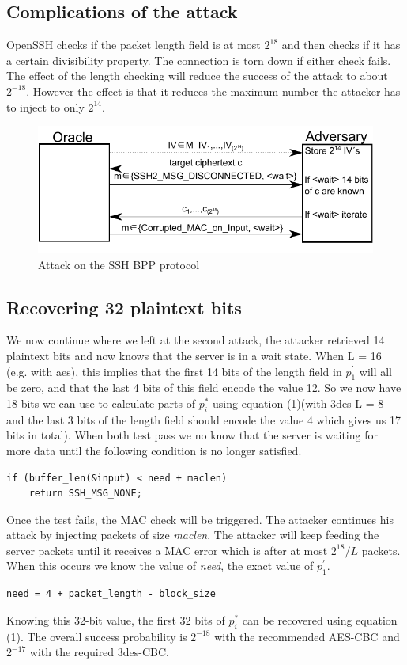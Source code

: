 \documentclass[twocolumn]{article}
\begin{document}
\subsection*{Complications of the attack}
OpenSSH checks if the packet length field is at most $2^{18}$ and then checks if it has a certain divisibility property. The connection is torn down if either check fails. The effect of the length checking will reduce the success of the attack to about $2^{-18}$. However the effect is that it reduces the maximum number the attacker has to inject to only $2^{14}$.

\begin{figure}
	  \centering
    	\includegraphics[scale=1]{drawing.pdf}
	\caption{Attack on the SSH BPP protocol~\cite{Albrecht2009}}
	\label{fig:BPPAttack}
\end{figure}

\subsection*{Recovering 32 plaintext bits}
We now continue where we left at the second attack, the attacker retrieved 14 plaintext bits and now knows that the server is in a wait state. When L = 16 (e.g. with aes), this implies that the first 14 bits of the length field in $p^{'}_1$ will all be zero, and that the last 4 bits of this field encode the value 12. So we now have 18 bits we can use to calculate parts of $p^*_i$ using equation (1)(with 3des L = 8 and the last 3 bits of the length field should encode the value 4 which gives us 17 bits in total). When both test pass we no know that the server is waiting for more data until the following condition is no longer satisfied.
\begin{verbatim}
if (buffer_len(&input) < need + maclen)
	return SSH_MSG_NONE;
\end{verbatim}
Once the test fails, the MAC check will be triggered. The attacker continues his attack by injecting packets of size \emph{maclen}. The attacker will keep feeding the server packets until it receives a MAC error which is after at most $2^{18}/L$ packets. When this occurs we know the value of \emph{need}, the exact value of $p_1^{'}$.
\begin{verbatim}
need = 4 + packet_length - block_size
\end{verbatim}
Knowing this 32-bit value, the first 32 bits of $p^*_i$ can be recovered using equation (1).
The overall success probability is $2^{-18}$ with the recommended AES-CBC and $2^{-17}$ with the required 3des-CBC.
\end{document}
